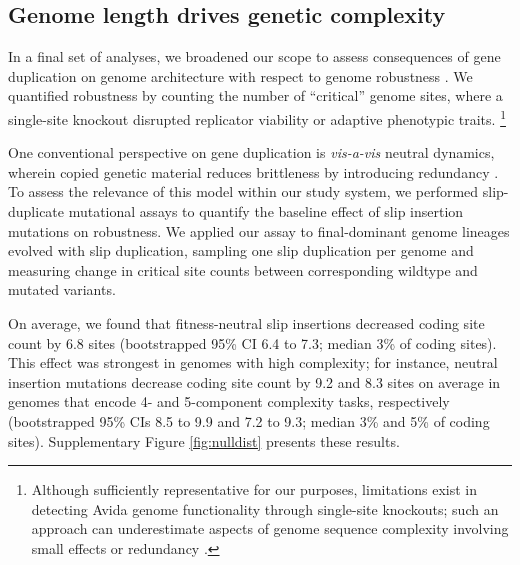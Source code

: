 \subsection{Genome length drives genetic complexity}



In a final set of analyses, we broadened our scope to assess consequences of gene duplication on genome architecture with respect to genome robustness \citep{lenski1999genome}.
We quantified robustness by counting the number of ``critical'' genome sites, where a single-site knockout disrupted replicator viability or adaptive phenotypic traits.%
\footnote{%
Although sufficiently representative for our purposes, limitations exist in detecting Avida genome functionality through single-site knockouts; such an approach can underestimate aspects of genome sequence complexity involving small effects or redundancy \citep{lenski1999genome,moreno2024cryptic}.
}

One conventional perspective on gene duplication is \textit{vis-a-vis} neutral dynamics, wherein copied genetic material reduces brittleness by introducing redundancy \citep{wagner1996genetic}.
To assess the relevance of this model within our study system, we performed slip-duplicate mutational assays to quantify the baseline effect of slip insertion mutations on robustness.
We applied our assay to final-dominant genome lineages evolved with slip duplication, sampling one slip duplication per genome and measuring change in critical site counts between corresponding wildtype and mutated variants.

On average, we found that fitness-neutral slip insertions decreased coding site count by 6.8 sites (bootstrapped 95\% CI 6.4 to 7.3; median 3\% of coding sites).
This effect was strongest in genomes with high complexity; for instance, neutral insertion mutations decrease coding site count by 9.2 and 8.3 sites on average in genomes that encode 4- and 5-component complexity tasks, respectively (bootstrapped 95\% CIs 8.5 to 9.9 and 7.2 to 9.3; median 3\% and 5\% of coding sites).
Supplementary Figure \ref{fig:nulldist} presents these results.


